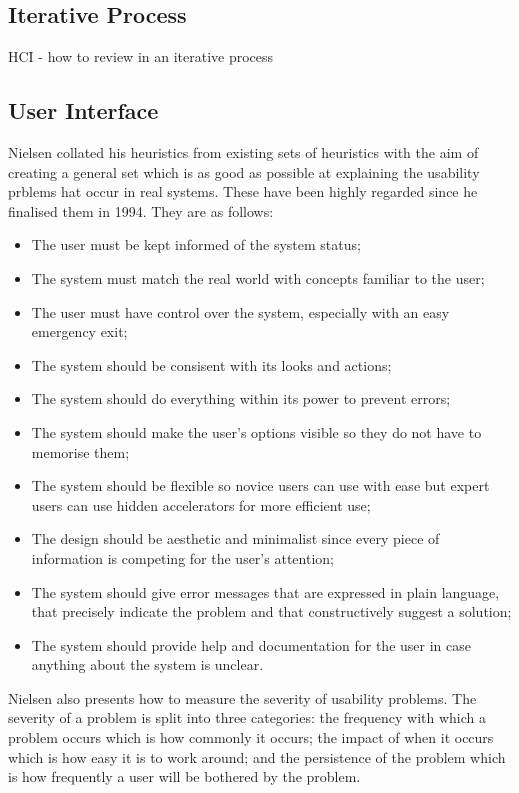 		\subsection{Iterative Process}
			HCI - how to review in an iterative process
		\subsection{User Interface}
			Nielsen collated his heuristics from existing sets of heuristics with the aim of creating a general set which is as good as possible at explaining the usability prblems hat occur in real systems\cite{usability_heuristics_nielsen}. These have been highly regarded since he finalised them in 1994. They are as follows: 
			\begin{itemize}
				\item The user must be kept informed of the system status;
				\item The system must match the real world with concepts familiar to the user;
				\item The user must have control over the system, especially with an easy emergency exit;
				\item The system should be consisent with its looks and actions;
				\item The system should do everything within its power to prevent errors;
				\item The system should make the user's options visible so they do not have to memorise them;
				\item The system should be flexible so novice users can use with ease but expert users can use hidden accelerators for more efficient use;
				\item The design should be aesthetic and minimalist since every piece of information is competing for the user's attention;
				\item The system should give error messages that are expressed in plain language, that precisely indicate the problem and that constructively suggest a solution;
				\item The system should provide help and documentation for the user in case anything about the system is unclear.
			\end{itemize}
			Nielsen also presents how to measure the severity of usability problems. The severity of a problem is split into three categories: the frequency with which a problem occurs which is how commonly it occurs; the impact of when it occurs which is how easy it is to work around; and the persistence of the problem which is how frequently a user will be bothered by the problem. 
